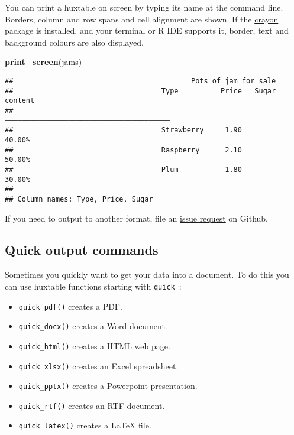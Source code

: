 \documentclass[]{article}
\newenvironment{Shaded}{\begin{snugshade}}{\end{snugshade}}
\newcommand{\KeywordTok}[1]{\textcolor[rgb]{0.13,0.29,0.53}{\textbf{#1}}}
\newcommand{\NormalTok}[1]{#1}
\providecommand{\tightlist}{%
  \setlength{\itemsep}{0pt}\setlength{\parskip}{0pt}}
\begin{document}
You can print a huxtable on screen by typing its name at the command
line. Borders, column and row spans and cell alignment are shown. If the
\href{https://cran.r-project.org/package=crayon}{crayon} package is
installed, and your terminal or R IDE supports it, border, text and
background colours are also displayed.

\begin{Shaded}
\begin{Highlighting}[]
\KeywordTok{print_screen}\NormalTok{(jams)}
\end{Highlighting}
\end{Shaded}

\begin{verbatim}
##                                          Pots of jam for sale                                          
##                                   Type          Price   Sugar content  
##                                 ───────────────────────────────────────
##                                   Strawberry     1.90          40.00%  
##                                   Raspberry      2.10          50.00%  
##                                   Plum           1.80          30.00%  
## 
## Column names: Type, Price, Sugar
\end{verbatim}

\FloatBarrier

If you need to output to another format, file an
\href{https://github.com/hughjonesd/huxtable}{issue request} on Github.

\hypertarget{quick-output-commands}{%
\subsection{Quick output commands}\label{quick-output-commands}}

Sometimes you quickly want to get your data into a document. To do this
you can use huxtable functions starting with \texttt{quick\_}:

\begin{itemize}
\tightlist
\item
  \texttt{quick\_pdf()} creates a PDF.
\item
  \texttt{quick\_docx()} creates a Word document.
\item
  \texttt{quick\_html()} creates a HTML web page.
\item
  \texttt{quick\_xlsx()} creates an Excel spreadsheet.
\item
  \texttt{quick\_pptx()} creates a Powerpoint presentation.
\item
  \texttt{quick\_rtf()} creates an RTF document.
\item
  \texttt{quick\_latex()} creates a LaTeX file.
\end{itemize}
\end{document}
